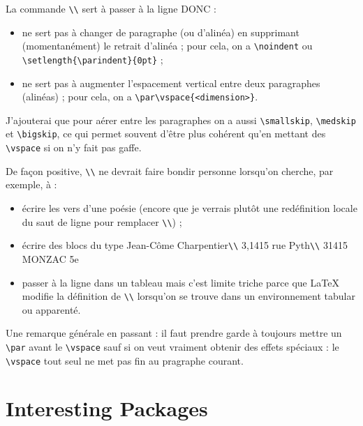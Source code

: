 \documentclass{mcreport}
\begin{document}
La commande \verb|\\| sert à passer à la ligne DONC :

\begin{itemize}
    \item ne sert pas à changer de paragraphe (ou d'alinéa) en supprimant
    (momentanément) le retrait d'alinéa ; pour cela, on a \verb|\noindent|
    ou \verb|\setlength{\parindent}{0pt}| ;

    \item ne sert pas à augmenter l'espacement vertical entre deux
    paragraphes (alinéas) ; pour cela, on a \verb|\par\vspace{<dimension>}|.
\end{itemize}

J'ajouterai que pour aérer entre les paragraphes on a aussi
\verb|\smallskip|, \verb|\medskip| et \verb|\bigskip|, ce qui permet souvent
d'être plus cohérent qu'en mettant des \verb|\vspace| si on n'y fait pas
gaffe.

De façon positive, \verb|\\| ne devrait faire bondir personne lorsqu'on
cherche, par exemple, à :

\begin{itemize}
    \item écrire les vers d'une poésie (encore que je verrais plutôt une
    redéfinition locale du saut de ligne pour remplacer \verb|\\|) ;

    \item écrire des blocs du type
    Jean-Côme Charpentier\verb|\\|
    3,1415 rue Pyth\verb|\\|
    31415 MONZAC 5e

    \item passer à la ligne dans un tableau mais c'est limite triche parce
    que LaTeX modifie la définition de \verb|\\| lorsqu'on se trouve dans un
    environnement tabular ou apparenté.
\end{itemize}

Une remarque générale en passant : il faut prendre garde à toujours mettre
un \verb|\par| avant le \verb|\vspace| sauf si on veut vraiment obtenir des
effets spéciaux : le \verb|\vspace| tout seul ne met pas fin au pragraphe
courant.


\section{Interesting Packages}
\label{sec:interesting-packages}
\end{document}
